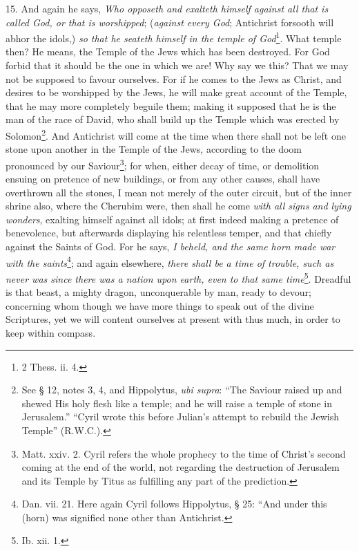 15. And again he says, \emph{Who opposeth and exalteth himself against all that is called God, or that is worshipped}; (\emph{against every God}; Antichrist forsooth will abhor the idols,) \emph{so that he seateth himself in the temple of God}\footnote{2 Thess. ii. 4.}. What temple then? He means, the Temple of the Jews which has been destroyed. For God forbid that it should be the one in which we are! Why say we this? That we may not be supposed to favour ourselves. For if he comes to the Jews as Christ, and desires to be worshipped by the Jews, he will make great account of the Temple, that he may more completely beguile them; making it supposed that he is the man of the race of David, who shall build up the Temple which was erected by Solomon\footnote{See § 12, notes 3, 4, and Hippolytus, \emph{ubi supra}: “The Saviour raised up and shewed His holy flesh like a temple; and he will raise a temple of stone in Jerusalem.” “Cyril wrote this before Julian’s attempt to rebuild the Jewish Temple” (\textsc{R.W.C}.).}. And Antichrist will come at the time when there shall not be left one stone upon another in the Temple of the Jews, according to the doom pronounced by our Saviour\footnote{Matt. xxiv. 2. Cyril refers the whole prophecy to the time of Christ’s second coming at the end of the world, not regarding the destruction of Jerusalem and its Temple by Titus as fulfilling any part of the prediction.}; for when, either decay of time, or demolition ensuing on pretence of new buildings, or from any other causes, shall have overthrown all the stones, I mean not merely of the outer circuit, but of the inner shrine also, where the Cherubim were, then shall he come \emph{with all signs and lying wonders}, exalting himself against all idols; at first indeed making a pretence of benevolence, but afterwards displaying his relentless temper, and that chiefly against the Saints of God. For he says, \emph{I beheld, and the same horn made war with the saints}\footnote{Dan. vii. 21. Here again Cyril follows Hippolytus, § 25: “And under this (horn) was signified none other than Antichrist.}; and again elsewhere, \emph{there shall be a time of trouble, such as never was since there was a nation upon earth, even to that same time}\footnote{Ib. xii. 1.}. Dreadful is that beast, a mighty dragon, unconquerable by man, ready to devour; concerning whom though we have more things to speak out of the divine Scriptures, yet we will content ourselves at present with thus much, in order to keep within compass.

